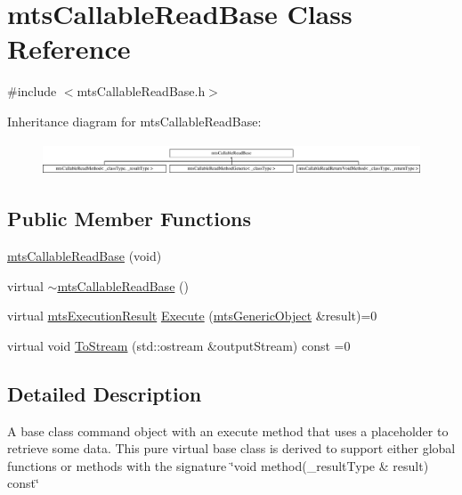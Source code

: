 \hypertarget{classmts_callable_read_base}{\section{mts\-Callable\-Read\-Base Class Reference}
\label{classmts_callable_read_base}
}


{\ttfamily \#include $<$mts\-Callable\-Read\-Base.\-h$>$}

Inheritance diagram for mts\-Callable\-Read\-Base\-:\begin{figure}[H]
\begin{center}
\leavevmode
\includegraphics[height=0.972222cm]{d3/d9b/classmts_callable_read_base}
\end{center}
\end{figure}
\subsection*{Public Member Functions}
\begin{DoxyCompactItemize}
\item 
\hyperlink{classmts_callable_read_base_a2e41f1bfecb9bda1ca5e0d0ee10f3a0e}{mts\-Callable\-Read\-Base} (void)
\item 
virtual \hyperlink{classmts_callable_read_base_a46a1b8f36181396ab482e3e0fa7f8e72}{$\sim$mts\-Callable\-Read\-Base} ()
\item 
virtual \hyperlink{classmts_execution_result}{mts\-Execution\-Result} \hyperlink{classmts_callable_read_base_ab5dbf9b7df75841d7f0a48fa40358d5f}{Execute} (\hyperlink{classmts_generic_object}{mts\-Generic\-Object} \&result)=0
\item 
virtual void \hyperlink{classmts_callable_read_base_a934fc1fadbf9bedcbfd5f498a07a4160}{To\-Stream} (std\-::ostream \&output\-Stream) const =0
\end{DoxyCompactItemize}


\subsection{Detailed Description}
A base class command object with an execute method that uses a placeholder to retrieve some data. This pure virtual base class is derived to support either global functions or methods with the signature \char`\"{}void method(\-\_\-result\-Type \& result) const\char`\"{} 

